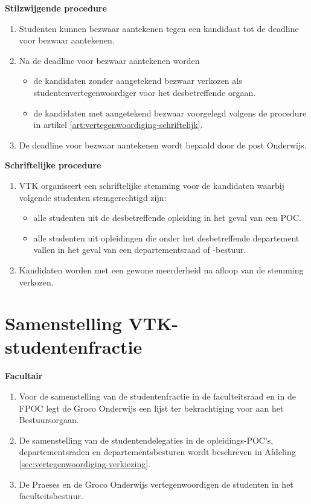     \textbf{Stilzwijgende procedure}\label{art:vertegenwoordiging-stilzwijgend}
    \begin{enumerate}
    \item Studenten kunnen bezwaar aantekenen tegen een kandidaat tot de deadline voor bezwaar aantekenen.
    \item Na de deadline voor bezwaar aantekenen worden
        \begin{itemize}
        \item de kandidaten zonder aangetekend bezwaar verkozen als studentenvertegenwoordiger voor het desbetreffende orgaan.
        \item de kandidaten met aangetekend bezwaar voorgelegd volgens de procedure in artikel \ref{art:vertegenwoordiging-schriftelijk}.
        \end{itemize}
    \item De deadline voor bezwaar aantekenen wordt bepaald door de post Onderwijs.
    \end{enumerate}
    
    \textbf{Schriftelijke procedure}\label{art:vertegenwoordiging-schriftelijk}
    \begin{enumerate}
    \item VTK organiseert een schriftelijke stemming voor de kandidaten waarbij volgende studenten stemgerechtigd zijn:
        \begin{itemize}
        \item alle studenten uit de desbetreffende opleiding in het geval van een POC.
        \item alle studenten uit opleidingen die onder het desbetreffende departement vallen in het geval van een departementsraad of -bestuur. 
        \end{itemize}
    \item Kandidaten worden met een gewone meerderheid na afloop van de stemming verkozen.
    \end{enumerate}

\section{Samenstelling VTK-studentenfractie}

    \textbf{Facultair}
    \begin{enumerate}
    \item Voor de samenstelling van de studentenfractie in de faculteitsraad en in de FPOC legt de Groco Onderwijs een lijst ter bekrachtiging voor aan het Bestuursorgaan.
    \item De samenstelling van de studentendelegaties in de opleidings-POC’s, departementsraden en departementsbesturen wordt beschreven in Afdeling \ref{sec:vertegenwoordiging-verkiezing}.
    \item De Praeses en de Groco Onderwijs vertegenwoordigen de studenten in het faculteitsbestuur.
    \end{enumerate}

